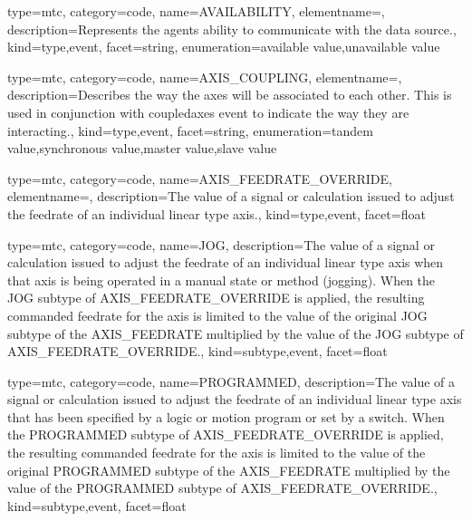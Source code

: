 {
  type=mtc,
  category=code,
  name={AVAILABILITY},
  elementname=,
  description={Represents the \gls{agent}s ability to communicate with the data source.},
  kind={type,event},
  facet={\gls{string}},
  enumeration={\gls{available value},\gls{unavailable value}}
}


{
  type=mtc,
  category=code,
  name={AXIS\_COUPLING},
  elementname=,
  description={Describes the way the axes will be associated to each other. This is used in conjunction with \gls{coupledaxes event} to indicate the way they are interacting.},
  kind={type,event},
  facet={\gls{string}},
  enumeration={\gls{tandem value},\gls{synchronous value},\gls{master value},\gls{slave value}}
}


{
  type=mtc,
  category=code,
  name={AXIS\_FEEDRATE\_OVERRIDE},
  elementname=,
  description={The value of a signal or calculation issued to adjust the feedrate of an individual linear type axis.},
  kind={type,event},
  facet={\gls{float}}
}


{
  type=mtc,
  category=code,
  name={JOG},
  description={The value of a signal or calculation issued to adjust the feedrate of an individual linear type axis when that axis is being operated in a manual state or method (jogging).   \newline When the JOG subtype of AXIS\_FEEDRATE\_OVERRIDE is applied, the resulting commanded feedrate for the axis is limited to the value of the original JOG subtype of the AXIS\_FEEDRATE multiplied by the value of the JOG subtype of AXIS\_FEEDRATE\_OVERRIDE.},
  kind={subtype,event},
  facet={\gls{float}}
}


{
  type=mtc,
  category=code,
  name={PROGRAMMED},
  description={The value of a signal or calculation issued to adjust the feedrate of an individual linear type axis that has been specified by a logic or motion program or set by a switch. \newline When the PROGRAMMED subtype of AXIS\_FEEDRATE\_OVERRIDE is applied, the resulting commanded feedrate for the axis is limited to the value of the original PROGRAMMED subtype of the AXIS\_FEEDRATE multiplied by the value of the PROGRAMMED subtype of AXIS\_FEEDRATE\_OVERRIDE.},
  kind={subtype,event},
  facet={\gls{float}}
}


